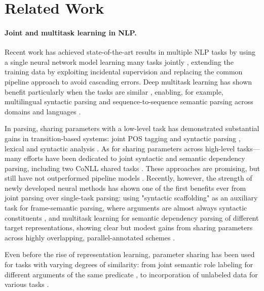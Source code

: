 \documentclass[11pt,a4paper]{article}
\begin{document}
\section{Related Work}\label{sec:related_work}

\paragraph{Joint and multitask learning in NLP.}

Recent work has achieved state-of-the-art results in multiple NLP tasks
by using a single neural network model learning many tasks jointly
\cite{collobert2011natural,D17-1206},
extending the training data by exploiting incidental supervision \cite{DBLP:conf/aaai/Roth17}
and replacing the common pipeline approach to avoid cascading errors.
Deep multitask learning has shown benefit particularly when the tasks are similar
\cite{P15-1166,P16-2038,D17-1134},
enabling, for example, multilingual syntactic parsing
\cite{Q16-1031,guo2016exploiting}
and sequence-to-sequence semantic parsing across domains and languages
\cite{herzig-berant:2017:Short,W17-2607,duong2017multilingual}.

In parsing, sharing parameters with a low-level task
has demonstrated substantial gains in transition-based systems:
joint POS tagging and syntactic parsing
\cite{bohnet2012transition,Zhang2016StackpropagationIR},
lexical and syntactic analysis \cite{constant-nivre:2016:P16-1,more2016joint}.
As for sharing parameters across high-level tasks---many
efforts have been dedicated to joint syntactic and semantic dependency parsing,
including two CoNLL shared tasks \cite{surdeanu2008conll,hajivc2009conll}.
These approaches are promising, but still have not outperformed pipeline models
\cite{lluis2008joint,henderson2013multilingual,D15-1169,swayamdipta-EtAl:2016:CoNLL}.
Recently, however, the strength of newly developed neural methods has shown one of the
first benefits ever from joint parsing over single-task parsing:
using "syntactic scaffolding" as an auxiliary task for frame-semantic parsing,
where arguments are almost always syntactic constituents \cite{swayamdipta2017frame},
and multitask learning for semantic dependency parsing of different target representations,
showing clear but modest gains from sharing parameters across highly overlapping, parallel-annotated
schemes \cite{P17-1186}.

Even before the rise of representation learning,
parameter sharing has been used for tasks with varying degrees of similarity:
from joint semantic role labeling for different arguments of the same predicate
\cite{toutanova2005joint},
to incorporation of unlabeled data for various tasks \cite{ando2005framework}.
\end{document}
